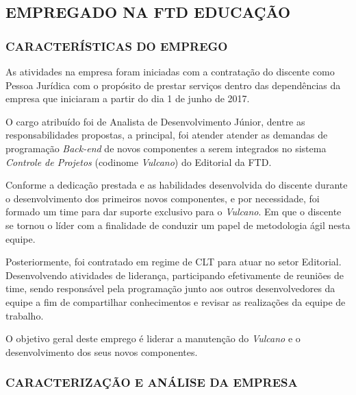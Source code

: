 \documentclass[
  12pt,            %
  openany,
  oneside,
  a4paper,         %
  english,      %
  brazil
]{article}
\numberwithin{figure}{section}
\numberwithin{table}{section}
\begin{document}
\subsection{EMPREGADO NA FTD EDUCAÇÃO}

\subsubsection{CARACTERÍSTICAS DO EMPREGO}

As atividades na empresa foram iniciadas com a contratação do discente como Pessoa Jurídica com o propósito de prestar serviços dentro das dependências da empresa que iniciaram a partir do dia 1 de junho de 2017.

O cargo atribuído foi de Analista de Desenvolvimento Júnior, dentre as responsabilidades propostas, a principal, foi atender atender as demandas de programação \textit{Back-end} de novos componentes a serem integrados no sistema \textit{Controle de Projetos} (codinome \textit{Vulcano}) do Editorial da FTD.



Conforme a dedicação prestada e as habilidades desenvolvida do discente durante o desenvolvimento dos primeiros novos componentes, e por necessidade, foi formado um time para dar suporte exclusivo para o \textit{Vulcano}. Em que o discente se tornou o líder com a finalidade de conduzir um papel de metodologia ágil nesta equipe.

Posteriormente, foi contratado em regime de CLT para atuar no setor Editorial. Desenvolvendo atividades de liderança, participando efetivamente de reuniões de time, sendo responsável pela programação junto aos outros desenvolvedores da equipe a fim de compartilhar conhecimentos e revisar as realizações da equipe de trabalho.

O objetivo geral deste emprego é liderar a manutenção do \textit{Vulcano} e o desenvolvimento dos seus novos componentes.


\subsubsection{CARACTERIZAÇÃO E ANÁLISE DA EMPRESA}
\end{document}
